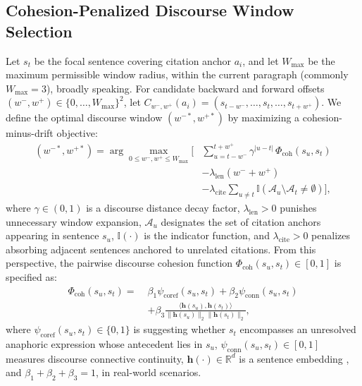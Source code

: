 \documentclass[journal]{IEEEtran}
\begin{document}
\subsection{Cohesion-Penalized Discourse Window Selection}
Let $s_t$ be the focal sentence covering citation anchor $a_i$, and let $W_{\max}$ be the maximum permissible window radius, within the current paragraph (commonly $W_{\max}=3$), broadly speaking. For candidate backward and forward offsets $(w^-, w^+) \in \{0, \dots, W_{\max}\}^2$, let $C_{w^-, w^+}(a_i) = (s_{t-w^-}, \dots, s_t, \dots, s_{t+w^+})$. We define the optimal discourse window $(w^{-*}, w^{+*})$ by maximizing a cohesion-minus-drift objective:
\begin{equation}
\begin{aligned}
(w^{-*}, w^{+*}) = \arg\max_{0 \leq w^-, w^+ \leq W_{\max}} \Bigg[ & \sum_{u=t-w^-}^{t+w^+} \gamma^{|u-t|} \, \Phi_{\text{coh}}(s_u, s_t) \\
& - \lambda_{\text{len}} (w^- + w^+) \\
& - \lambda_{\text{cite}} \sum_{u \neq t} \mathbb{I}(\mathcal{A}_u \setminus \mathcal{A}_t \neq \emptyset) \Bigg],
\end{aligned}
\label{eq:window_opt}
\end{equation}
where $\gamma \in (0, 1)$ is a discourse distance decay factor, $\lambda_{\text{len}} > 0$ punishes unnecessary window expansion, $\mathcal{A}_u$ designates the set of citation anchors appearing in sentence $s_u$, $\mathbb{I}(\cdot)$ is the indicator function, and $\lambda_{\text{cite}} > 0$ penalizes absorbing adjacent sentences anchored to unrelated citations. From this perspective, the pairwise discourse cohesion function $\Phi_{\text{coh}}(s_u, s_t) \in [0, 1]$ is specified as:
\begin{equation}
\begin{aligned}
\Phi_{\text{coh}}(s_u, s_t) = \;& \beta_1 \psi_{\text{coref}}(s_u, s_t) + \beta_2 \psi_{\text{conn}}(s_u, s_t) \\
& + \beta_3 \frac{\langle \mathbf{h}(s_u), \mathbf{h}(s_t) \rangle}{\|\mathbf{h}(s_u)\|_2 \|\mathbf{h}(s_t)\|_2},
\end{aligned}
\label{eq:cohesion_score}
\end{equation}
where $\psi_{\text{coref}}(s_u, s_t) \in \{0, 1\}$ is suggesting whether $s_t$ encompasses an unresolved anaphoric expression whose antecedent lies in $s_u$, $\psi_{\text{conn}}(s_u, s_t) \in [0, 1]$ measures discourse connective continuity, $\mathbf{h}(\cdot) \in \mathbb{R}^d$ is a sentence embedding \cite{beltagy2019scibert,reimers2019sentence}, and $\beta_1 + \beta_2 + \beta_3 = 1$, in real-world scenarios.
\end{document}
